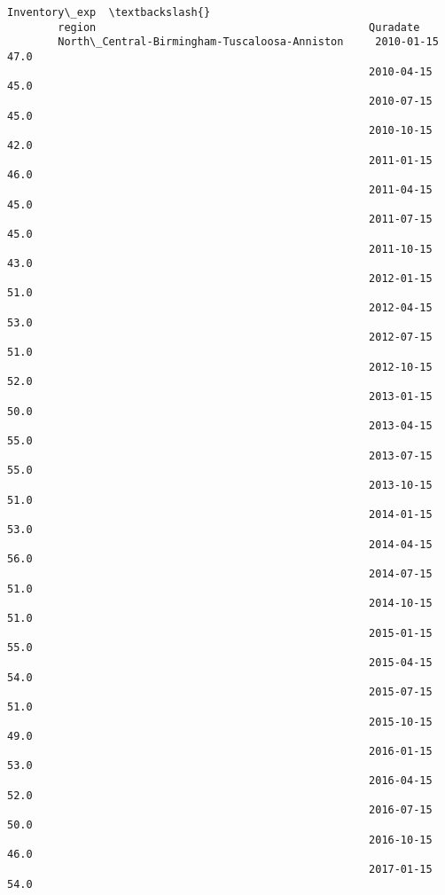 \documentclass[11pt]{article}
\begin{document}
\begin{Verbatim}[commandchars=\\\{\}]
                                                                     Inventory\_exp  \textbackslash{}
        region                                           Quradate                    
        North\_Central-Birmingham-Tuscaloosa-Anniston     2010-01-15           47.0   
                                                         2010-04-15           45.0   
                                                         2010-07-15           45.0   
                                                         2010-10-15           42.0   
                                                         2011-01-15           46.0   
                                                         2011-04-15           45.0   
                                                         2011-07-15           45.0   
                                                         2011-10-15           43.0   
                                                         2012-01-15           51.0   
                                                         2012-04-15           53.0   
                                                         2012-07-15           51.0   
                                                         2012-10-15           52.0   
                                                         2013-01-15           50.0   
                                                         2013-04-15           55.0   
                                                         2013-07-15           55.0   
                                                         2013-10-15           51.0   
                                                         2014-01-15           53.0   
                                                         2014-04-15           56.0   
                                                         2014-07-15           51.0   
                                                         2014-10-15           51.0   
                                                         2015-01-15           55.0   
                                                         2015-04-15           54.0   
                                                         2015-07-15           51.0   
                                                         2015-10-15           49.0   
                                                         2016-01-15           53.0   
                                                         2016-04-15           52.0   
                                                         2016-07-15           50.0   
                                                         2016-10-15           46.0   
                                                         2017-01-15           54.0   

\end{Verbatim}
\end{document}
